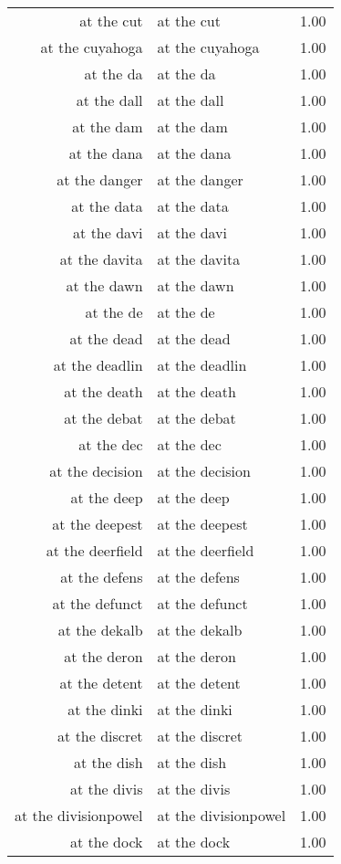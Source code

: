 \begin{table}[ht]
\begin{tabular}{rlr}
  at the cut & at the cut & 1.00 \\ 
  at the cuyahoga & at the cuyahoga & 1.00 \\ 
  at the da & at the da & 1.00 \\ 
  at the dall & at the dall & 1.00 \\ 
  at the dam & at the dam & 1.00 \\ 
  at the dana & at the dana & 1.00 \\ 
  at the danger & at the danger & 1.00 \\ 
  at the data & at the data & 1.00 \\ 
  at the davi & at the davi & 1.00 \\ 
  at the davita & at the davita & 1.00 \\ 
  at the dawn & at the dawn & 1.00 \\ 
  at the de & at the de & 1.00 \\ 
  at the dead & at the dead & 1.00 \\ 
  at the deadlin & at the deadlin & 1.00 \\ 
  at the death & at the death & 1.00 \\ 
  at the debat & at the debat & 1.00 \\ 
  at the dec & at the dec & 1.00 \\ 
  at the decision & at the decision & 1.00 \\ 
  at the deep & at the deep & 1.00 \\ 
  at the deepest & at the deepest & 1.00 \\ 
  at the deerfield & at the deerfield & 1.00 \\ 
  at the defens & at the defens & 1.00 \\ 
  at the defunct & at the defunct & 1.00 \\ 
  at the dekalb & at the dekalb & 1.00 \\ 
  at the deron & at the deron & 1.00 \\ 
  at the detent & at the detent & 1.00 \\ 
  at the dinki & at the dinki & 1.00 \\ 
  at the discret & at the discret & 1.00 \\ 
  at the dish & at the dish & 1.00 \\ 
  at the divis & at the divis & 1.00 \\ 
  at the divisionpowel & at the divisionpowel & 1.00 \\ 
  at the dock & at the dock & 1.00 \\ 

\end{tabular}
\end{table}
